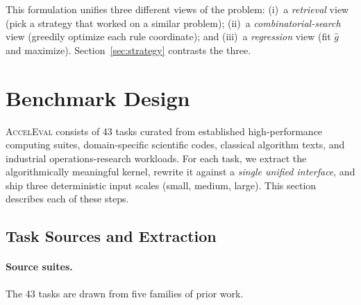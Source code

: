 \documentclass{article}
\begin{document}
This formulation unifies three different views of the problem: (i)~a
\emph{retrieval} view (pick a strategy that worked on a similar
problem); (ii)~a \emph{combinatorial-search} view (greedily optimize
each rule coordinate); and (iii)~a \emph{regression} view (fit
$\hat{g}$ and maximize). Section~\ref{sec:strategy} contrasts the
three.

\section{Benchmark Design}
\label{sec:design}

\textsc{AccelEval} consists of 43 tasks curated from established
high-performance computing suites, domain-specific scientific codes,
classical algorithm texts, and industrial operations-research workloads.
For each task, we extract the algorithmically meaningful kernel, rewrite
it against a \emph{single unified interface}, and ship three deterministic
input scales (small, medium, large). This section describes each of these
steps.

\subsection{Task Sources and Extraction}
\label{sec:sources}

\paragraph{Source suites.}
The 43 tasks are drawn from five families of prior work.
\end{document}
